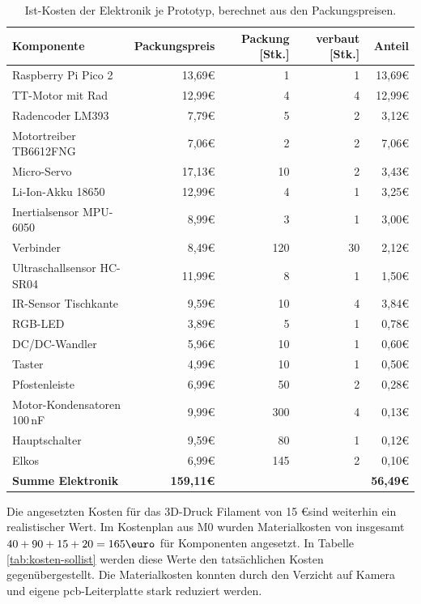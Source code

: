 \begin{table}[H]
\centering
\footnotesize
\caption{Ist-Kosten der Elektronik je Prototyp, berechnet aus den Packungspreisen.}
\label{tab:elektronik-ist}
\begin{tabular}{@{}lrrrr@{}}
\toprule
\textbf{Komponente} & \textbf{Packungspreis} & \textbf{Packung [Stk.]} & \textbf{verbaut [Stk.]} & \textbf{Anteil}\\
\midrule
Raspberry Pi Pico 2 & 13,69\euro & 1 & 1 & 13,69\euro\\
TT-Motor mit Rad & 12,99\euro & 4 & 4 & 12,99\euro\\
Radencoder LM393 & 7,79\euro & 5 & 2 & 3,12\euro\\
Motortreiber TB6612FNG & 7,06\euro & 2 & 2 & 7,06\euro\\
Micro-Servo & 17,13\euro & 10 & 2 & 3,43\euro\\
Li-Ion-Akku 18650 & 12,99\euro & 4 & 1 & 3,25\euro\\
Inertialsensor MPU-6050 & 8,99\euro & 3 & 1 & 3,00\euro\\
Verbinder & 8,49\euro & 120 & 30 & 2,12\euro\\
Ultraschallsensor HC-SR04 & 11,99\euro & 8 & 1 & 1,50\euro\\
IR-Sensor Tischkante & 9,59\euro & 10 & 4 & 3,84\euro\\
RGB-LED & 3,89\euro & 5 & 1 & 0,78\euro\\
DC/DC-Wandler & 5,96\euro & 10 & 1 & 0,60\euro\\
Taster & 4,99\euro & 10 & 1 & 0,50\euro\\
Pfostenleiste & 6,99\euro & 50 & 2 & 0,28\euro\\
Motor-Kondensatoren 100\,nF & 9,99\euro & 300 & 4 & 0,13\euro\\
Hauptschalter & 9,59\euro & 80 & 1 & 0,12\euro\\
Elkos & 6,99\euro & 145 & 2 & 0,10\euro\\
\midrule
\textbf{Summe Elektronik} & \textbf{159,11\euro} & & & \textbf{56,49\euro}\\
\bottomrule
\end{tabular}
\end{table}


Die angesetzten Kosten für das 3D-Druck Filament von 15 \euro sind weiterhin ein realistischer Wert. Im Kostenplan aus M0 wurden Materialkosten von insgesamt $40 + 90 + 15 + 20 = 165 \text{\euro}$ für Komponenten angesetzt. In Tabelle \ref{tab:kosten-sollist} werden diese Werte den tatsächlichen Kosten gegenübergestellt. Die Materialkosten konnten durch den Verzicht auf Kamera und eigene \gls{pcb}-Leiterplatte stark reduziert werden. 


